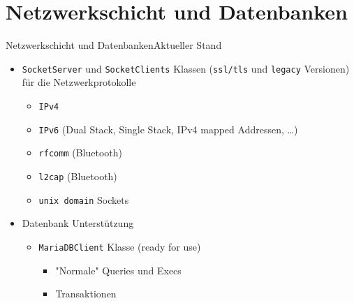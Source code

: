 ﻿\section{Netzwerkschicht und Datenbanken}

\begin{frame}{Netzwerkschicht und Datenbanken}{Aktueller Stand}
  \begin{itemize}
    \item \texttt{SocketServer} und \texttt{SocketClients} Klassen (\texttt{ssl/tls} und \texttt{legacy} Versionen) für die Netzwerkprotokolle
    \begin{itemize}
      \item \texttt{IPv4}
      \item \texttt{IPv6} (Dual Stack, Single Stack, IPv4 mapped Addressen, \ldots)
      \item \texttt{rfcomm} (Bluetooth)
      \item \texttt{l2cap} (Bluetooth)
      \item \texttt{unix domain} Sockets
    \end{itemize}
    \item Datenbank Unterstützung
    \begin{itemize}
      \item \texttt{MariaDBClient} Klasse (ready for use)
      \begin{itemize}
        \item "Normale"{} Queries und Execs
        \item Transaktionen
      \end{itemize}
    \end{itemize}
  \end{itemize}
\end{frame}
